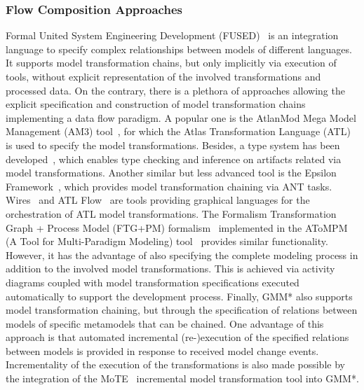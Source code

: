 \subsubsection{Flow Composition Approaches}
\label{sec:SotA-MO-Flow}

Formal United System Engineering Development (FUSED)~\cite{BoddyAVICPS2011} is
an integration language to specify complex relationships between models of
different languages. It supports model transformation chains, but only
implicitly via execution of tools, without explicit representation of the
involved transformations and processed data. On the contrary, there is a
plethora of approaches allowing the explicit specification and construction of
model transformation chains implementing a data flow paradigm. A popular one is
the AtlanMod Mega Model Management (AM3) tool~\cite{am3-website}, for which
the Atlas Transformation Language (ATL)~\cite{atl-website} is used to specify
the model transformations. Besides, a type system has been
developed~\cite{Vignaga_et_al:2013}, which enables type checking and inference
on artifacts related via model transformations.
Another similar but less advanced tool is the Epsilon
Framework~\cite{epsilon-website}, which  provides model transformation chaining
via ANT tasks. Wires~\cite{Wires-09} and ATL Flow~\cite{atlflow-website} are
tools providing graphical languages for the orchestration of ATL model
transformations.  The Formalism Transformation Graph + Process Model (FTG+PM)
formalism~\cite{Lucio_et_al:2013} implemented in the AToMPM (A Tool for
Multi-Paradigm Modeling) tool~\cite{atompm-website} provides similar
functionality. However, it has the advantage of also specifying the complete
modeling process in addition to the involved model transformations. This is
achieved via activity diagrams coupled with model transformation specifications
executed automatically to support the development process. Finally,
GMM* {\cite{BlouinGemoc2014}}  also supports model transformation
chaining, but through the specification of relations between models of specific
metamodels that can be chained. One advantage of this approach is that
automated incremental (re-)execution of the specified relations between models
is provided in response to received model change events.
Incrementality of the execution of the transformations is also made possible by
the integration of the MoTE~\cite{mote-website} incremental model
transformation tool into GMM*.

